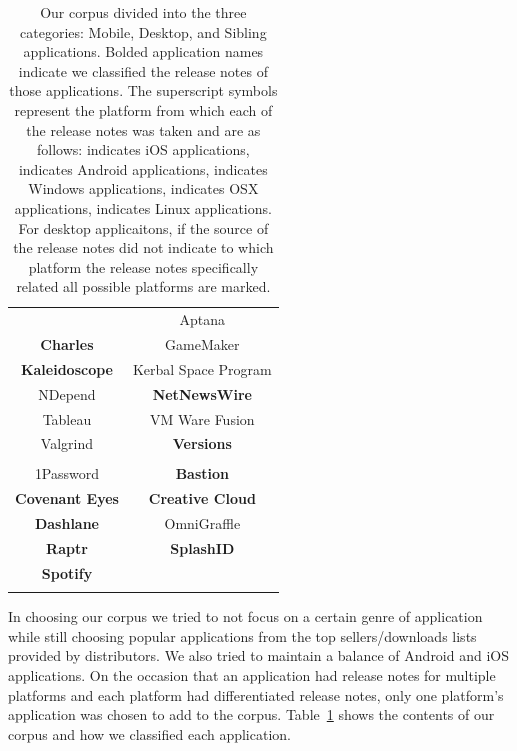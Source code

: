 \documentclass{acm_proc_article-sp}
\begin{document}
\begin{table}[t]
\begin{tabular}{c c}
\begin{tabular*}{.5\textwidth}{|c|c|}
			Acorn\mac & Aptana\windows\mac\linux \\
			\textbf{Charles\windows\mac\linux} & GameMaker\windows \\
			\textbf{Kaleidoscope\mac} & Kerbal Space Program\windows\mac\linux \\
			NDepend\windows & \textbf{NetNewsWire\mac} \\
			Tableau\windows & VM Ware Fusion\mac \\
			Valgrind\linux & \textbf{Versions\mac} \\  \cline{1-2}
		\end{tabular*}	
	&
	\begin{tabular*}{.5\textwidth}{|c|c|} \cline{1-2}
			\multicolumn{2}{|c|}{\large Sibling Applications} \\  \cline{1-2}
			1Password\mac\ios & \textbf{Bastion\windows\mac\linux\ios} \\
			\textbf{Covenant Eyes\windows\android} & \textbf{Creative Cloud\windows\mac\ios} \\
			\textbf{Dashlane\mac\windows\ios} & OmniGraffle\mac\ios \\
			\textbf{Raptr\windows\ios} & \textbf{SplashID\mac\android} \\
			\textbf{Spotify\windows\mac\linux\android} & \\  \cline{1-2}
		\end{tabular*}	

	\end{tabular}

	\caption{Our corpus divided into the three categories: Mobile, Desktop, and Sibling applications. Bolded application names indicate we classified the release notes of those applications. The superscript symbols represent the platform from which each of the release notes was taken and are as follows: \ios indicates iOS applications, \android indicates Android applications, \windows indicates Windows applications, \mac indicates OSX applications, \linux indicates Linux applications. For desktop applicaitons, if the source of the release notes did not indicate to which platform the release notes specifically related all possible platforms are marked.}
	\label{tab:corpus}
\end{table}

In choosing our corpus we tried to not focus on a certain genre of application while still choosing popular applications from the top sellers/downloads lists provided by distributors.
We also tried to maintain a balance of Android and iOS applications. On the occasion that an application had release notes for multiple platforms and each platform had differentiated release notes, only one platform's application was chosen to add to the corpus.
Table~\ref{tab:corpus} shows the contents of our corpus and how we classified each application.
\end{document}
